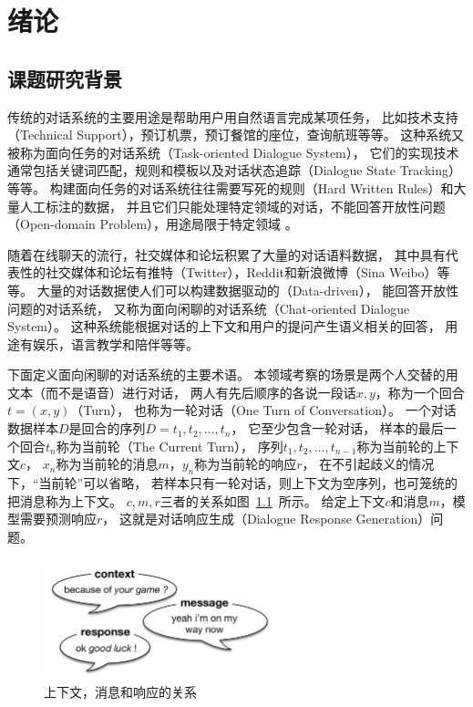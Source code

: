 \chapter{绪论}\label{ch:introduction}

\section{课题研究背景}\label{sec:research_background}
传统的对话系统的主要用途是帮助用户用自然语言完成某项任务，
比如技术支持（Technical Support），预订机票，预订餐馆的座位，查询航班等等。
这种系统又被称为面向任务的对话系统（Task-oriented Dialogue System），
它们的实现技术通常包括关键词匹配，规则和模板以及对话状态追踪（Dialogue State Tracking）等等。
构建面向任务的对话系统往往需要写死的规则（Hard Written Rules）和大量人工标注的数据，
并且它们只能处理特定领域的对话，不能回答开放性问题（Open-domain Problem），用途局限于特定领域
。

随着在线聊天的流行，社交媒体和论坛积累了大量的对话语料数据，
其中具有代表性的社交媒体和论坛有推特（Twitter），Reddit和新浪微博（Sina Weibo）等等。
大量的对话数据使人们可以构建数据驱动的（Data-driven），
能回答开放性问题的对话系统，
又称为面向闲聊的对话系统（Chat-oriented Dialogue System）。
这种系统能根据对话的上下文和用户的提问产生语义相关的回答，
用途有娱乐，语言教学和陪伴等等。

下面定义面向闲聊的对话系统的主要术语。
本领域考察的场景是两个人交替的用文本（而不是语音）进行对话，
两人有先后顺序的各说一段话$x, y$，称为一个回合$t = (x, y)$（Turn），
也称为一轮对话（One Turn of Conversation）。
一个对话数据样本$D$是回合的序列$D = t_1, t_2, \dots, t_n$，
它至少包含一轮对话，
样本的最后一个回合$t_n$称为当前轮（The Current Turn），
序列$t_1, t_2, \dots, t_{n-1}$称为当前轮的上下文$c$，
$x_n$称为当前轮的消息$m$，$y_n$称为当前轮的响应$r$，
在不引起歧义的情况下，“当前轮”可以省略，
若样本只有一轮对话，则上下文为空序列，也可笼统的把消息称为上下文。
$c,m,r$三者的关系如图~\ref{fig:context_message_response}~所示。
给定上下文$c$和消息$m$，模型需要预测响应$r$，
这就是对话响应生成（Dialogue Response Generation）问题。

\begin{figure}[H]
    \includegraphics[width=0.6\textwidth]{figure/context_message_response.png}
    \centering
    \caption{上下文，消息和响应的关系}
    \label{fig:context_message_response}
\end{figure}


